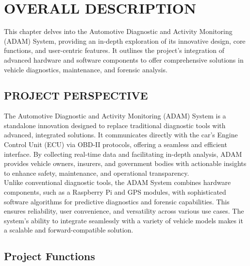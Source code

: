 \chapter{OVERALL DESCRIPTION}

This chapter delves into the Automotive Diagnostic and Activity Monitoring (ADAM) System, providing an in-depth exploration of its innovative design, core functions, and user-centric features. It outlines the project’s integration of advanced hardware and software components to offer comprehensive solutions in vehicle diagnostics, maintenance, and forensic analysis.

\section{PROJECT PERSPECTIVE}
The Automotive Diagnostic and Activity Monitoring (ADAM) System is a standalone innovation designed to replace traditional diagnostic tools with advanced, integrated solutions. It communicates directly with the car’s Engine Control Unit (ECU) via OBD-II protocols, offering a seamless and efficient interface. By collecting real-time data and facilitating in-depth analysis, ADAM provides vehicle owners, insurers, and government bodies with actionable insights to enhance safety, maintenance, and operational transparency.\\
Unlike conventional diagnostic tools, the ADAM System combines hardware components, such as a Raspberry Pi and GPS modules, with sophisticated software algorithms for predictive diagnostics and forensic capabilities. This ensures reliability, user convenience, and versatility across various use cases. The system’s ability to integrate seamlessly with a variety of vehicle models makes it a scalable and forward-compatible solution.

\section{Project Functions}

